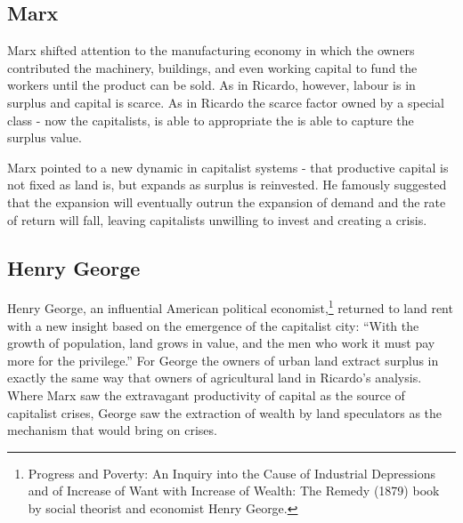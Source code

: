 \subsection{Marx}


 Marx shifted attention to the manufacturing economy in which the owners contributed the machinery, buildings, and even working capital to fund the workers until the product can be sold. %
As in Ricardo, however, labour is in surplus and capital is scarce. As in Ricardo the scarce factor owned by a special class - now the capitalists, is able to appropriate the is able to capture the surplus value. %

Marx pointed to a new dynamic in capitalist systems - that productive capital is not fixed as land is, but  expands as surplus is reinvested. He famously suggested that the expansion will eventually outrun the expansion of demand and the rate of return will fall, leaving capitalists unwilling to invest and creating a crisis. 


 
\subsection{Henry George} 
  Henry George, an influential American political economist,\footnote{Progress and Poverty: An Inquiry into the Cause of Industrial Depressions and of Increase of Want with Increase of Wealth: The Remedy (1879) book by social theorist and economist Henry George.}  returned to land rent with a new insight based on the emergence of the capitalist city: ``With the growth of population, land grows in value, and the men who work it must pay more for the privilege.'' For George the owners of urban land extract surplus in exactly the same way that owners of agricultural land in Ricardo's analysis. Where Marx saw  the extravagant productivity of capital  as the source of capitalist crises, George saw the extraction of wealth by land speculators as the mechanism that would bring on crises.
  
